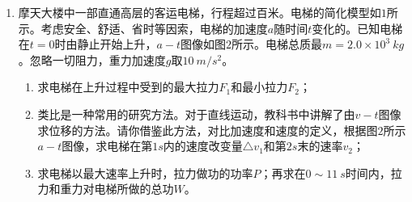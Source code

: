 \begin{enumerate}[leftmargin=0em]
{\begin{enumerate}
\end{enumerate}


}


\newpage
\item 
{}
摩天大楼中一部直通高层的客运电梯，行程超过百米。电梯的简化模型如$ 1 $所示。考虑安全、舒适、省时等因索，电梯的加速度$ a $随时间$ t $变化的。已知电梯在$ t=0 $时由静止开始上升，$ a - t $图像如图$ 2 $所示。电梯总质最$ m=2.0 \times 10^3 \ kg $。忽略一切阻力，重力加速度$ g $取$ 10 \ m/s^{2} $。


\begin{enumerate}
\renewcommand{\labelenumi}{\arabic{enumi}.}
\item
求电梯在上升过程中受到的最大拉力$ F_{1} $和最小拉力$ F_{2} $；
\item 
类比是一种常用的研究方法。对于直线运动，教科书中讲解了由$ v-t $图像求位移的方法。请你借鉴此方法，对比加速度和速度的定义，根据图$ 2 $所示$ a-t $图像，求电梯在第$ 1s $内的速度改变量$ \triangle v_{1} $和第$ 2s $末的速率$ v_{2} $；
\item 
求电梯以最大速率上升时，拉力做功的功率$ P $；再求在$ 0 \sim 11\ s $时间内，拉力和重力对电梯所做的总功$ W $。


\end{enumerate}
\begin{figure}[h!]
\flushright 

\end{figure}








\end{enumerate}

